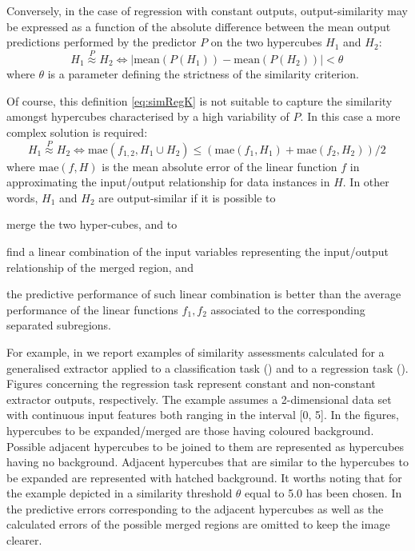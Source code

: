 \documentclass[
]{ceurart}
\begin{document}
Conversely, in the case of regression with constant outputs, output-similarity may be expressed as a function of the absolute difference between the mean output predictions performed by the predictor $P$ on the two hypercubes $H_1$ and $H_2$:
%
\begin{equation}\label{eq:simRegK}
	H_1 \stackrel{P}{\approx} H_2 \Leftrightarrow |\text{mean}(P(H_1)) - \text{mean}(P(H_2))| < \theta\,
\end{equation}
%
where $\theta$ is a parameter defining the strictness of the similarity criterion.

Of course, this definition \ref{eq:simRegK} is not suitable to capture the similarity amongst hypercubes characterised by a high variability of $P$.
%
In this case a more complex solution is required:
%
\begin{equation}\label{eq:simRegLin}
	H_1 \stackrel{P}{\approx} H_2 \Leftrightarrow \text{mae}(f_{1,2}, H_1 \cup H_2) \leq (\text{mae}(f_1, H_1) + \text{mae}(f_2, H_2)) / 2 \,
\end{equation}
%
where $\text{mae}(f, H)$ is the mean absolute error of the linear function $f$ in approximating the input/output relationship for data instances in $H$.
%
In other words, $H_1$ and $H_2$ are output-similar if it is possible to
%
\begin{inlinelist}
	\item merge the two hyper-cubes, and to
	\item find a linear combination of the input variables representing the input/output relationship of the merged region, and
	\item the predictive performance of such linear combination is better than the average performance of the linear functions $f_1, f_2$ associated to the corresponding separated subregions.
\end{inlinelist}



For example, in  we report examples of similarity assessments calculated for a generalised extractor applied to a classification task () and to a regression task ().
%
Figures concerning the regression task represent constant and non-constant extractor outputs, respectively.
%
The example assumes a 2-dimensional data set with continuous input features both ranging in the interval [0, 5].
%
In the figures, hypercubes to be expanded/merged are those having coloured background.
%
Possible adjacent hypercubes to be joined to them are represented as hypercubes having no background.
%
Adjacent hypercubes that are similar to the hypercubes to be expanded are represented with hatched background.
%
It worths noting that for the example depicted in  a similarity threshold $\theta$ equal to 5.0 has been chosen.
%
In  the predictive errors corresponding to the adjacent hypercubes as well as the calculated errors of the possible merged regions are omitted to keep the image clearer.
\end{document}
